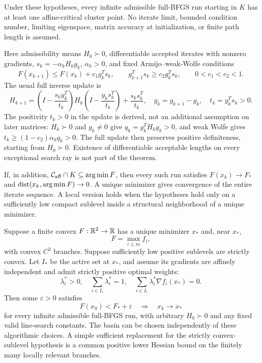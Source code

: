 \begin{theorem}\label{C:thm:cluster}
Under these hypotheses, every infinite admissible full-BFGS run starting in $K$ has at least one affine-critical cluster point. No iterate limit, bounded condition number, limiting eigenspace, matrix accuracy at initialization, or finite path length is assumed.
\end{theorem}

Here admissibility means $H_0\succ0$, differentiable accepted iterates with nonzero gradients, $s_k=-\alpha_kH_kg_k$, $\alpha_k>0$, and fixed Armijo--weak-Wolfe conditions
\begin{equation}\label{C:eq:AW}
 F(x_{k+1})\le F(x_k)+c_1g_k^Ts_k,\qquad
 g_{k+1}^Ts_k\ge c_2g_k^Ts_k,\qquad 0<c_1<c_2<1.
\end{equation}
The usual full inverse update is
\begin{equation}\label{C:eq:bfgs}
 H_{k+1}=\left(I-\frac{s_ky_k^T}{t_k}\right)H_k
 \left(I-\frac{y_ks_k^T}{t_k}\right)+\frac{s_ks_k^T}{t_k},\quad
 y_k=g_{k+1}-g_k,\quad t_k=y_k^Ts_k>0.
\end{equation}
The positivity $t_k>0$ in the update is derived, not an additional assumption on later matrices: $H_k\succ0$ and $g_k\ne0$ give $q_k=g_k^TH_kg_k>0$, and weak Wolfe gives $t_k\ge(1-c_2)\alpha_kq_k>0$. The full update then preserves positive definiteness, starting from $H_0\succ0$. Existence of differentiable acceptable lengths on every exceptional search ray is not part of the theorem.

\begin{corollary}\label{C:cor:AC}
If, in addition, $\mathcal C_{\rm aff}\cap K\subseteq\arg\min F$, then every such run satisfies $F(x_k)\to F_*$ and $\operatorname{dist}(x_k,\arg\min F)\to0$. A unique minimizer gives convergence of the entire iterate sequence. A local version holds when the hypotheses hold only on a sufficiently low compact sublevel inside a structural neighborhood of a unique minimizer.
\end{corollary}

\begin{corollary}\label{C:cor:max}
Suppose a finite convex $F:\mathbb R^2\to\mathbb R$ has a unique minimizer $x_*$ and, near $x_*$,
\[
 F=\max_{i\le m}f_i,
\]
with convex $C^2$ branches. Suppose sufficiently low positive sublevels are strictly convex. Let $I_*$ be the active set at $x_*$, and assume its gradients are affinely independent and admit strictly positive optimal weights:
\begin{equation}\label{C:eq:nondeg}
 \lambda_i^*>0,\quad \sum_{i\in I_*}\lambda_i^*=1,\quad
 \sum_{i\in I_*}\lambda_i^*\nabla f_i(x_*)=0.
\end{equation}
Then some $\varepsilon>0$ satisfies
\[
 F(x_0)<F_*+\varepsilon\quad\Longrightarrow\quad x_k\to x_*
\]
for every infinite admissible full-BFGS run, with arbitrary $H_0\succ0$ and any fixed valid line-search constants. The basin can be chosen independently of these algorithmic choices. A simple sufficient replacement for the strictly convex-sublevel hypothesis is a common positive lower Hessian bound on the finitely many locally relevant branches.
\end{corollary}

